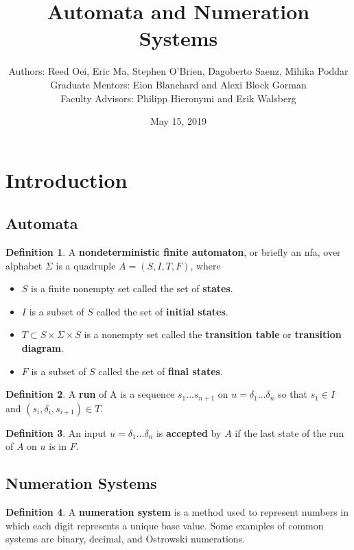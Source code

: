 \documentclass[a4paper]{article}
\title{Automata and Numeration Systems}
\author{
Authors: Reed Oei, Eric Ma, Stephen O'Brien, Dagoberto Saenz, Mihika Poddar \\
Graduate Mentors: Eion Blanchard and Alexi Block Gorman\\
Faculty Advisors: Philipp Hieronymi and
Erik Walsberg\\
}
\date{May 15, 2019}
\theoremstyle{definition}
\newtheorem{definition}{Definition}[section]
\theoremstyle{remark}
\theoremstyle{remark}
\theoremstyle{plain}
\begin{document}
\maketitle

\section{Introduction}

\subsection{Automata}

	\begin{definition}A \textbf{nondeterministic finite automaton}, or briefly an nfa, over alphabet $\Sigma$ is a quadruple $A = (S, I, T, F)$, where
	\begin{itemize}
		\item $S$ is a finite nonempty set called the set of \textbf{states}.\\
		\item $I$ is a subset of $S$ called the set of \textbf{initial states}.\\
		\item $T \subset S \times \Sigma \times S$ is a nonempty set called the \textbf{transition table} or \textbf{transition diagram}.\\
		\item $F$ is a subset of $S$ called the set of \textbf{final states}.
	\end{itemize}
\end{definition}

\begin{definition}
A \textbf{run} of A is a sequence $s_1...s_{n+1}$ on $u=\delta_1 ... \delta_n$ so that $s_1 \in I$ and $(s_i, \delta_i, s_{i+1}) \in T$.
\end{definition}

\begin{definition}
An input $u = \delta_1 ... \delta_n$ is \textbf{accepted} by $A$ if the last state of the run of $A$ on $u$ is in $F$.\\
\end{definition}


\subsection{Numeration Systems}

\begin{definition}A \textbf{numeration system} is a method used to represent numbers in which each digit represents a unique base value. Some examples of common systems are binary, decimal, and Ostrowski numerations.
\end{definition}
\end{document}
